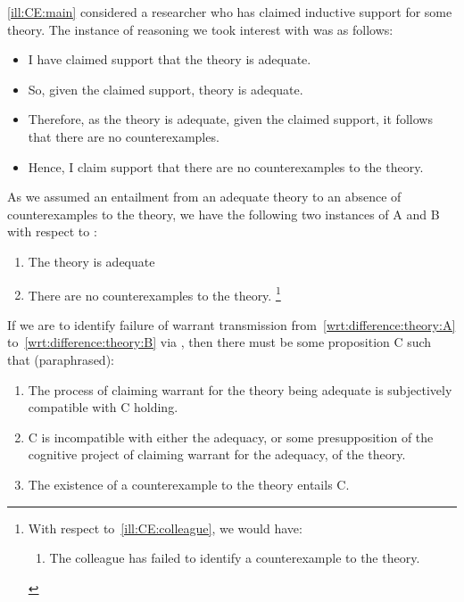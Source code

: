 \begin{note}
  \autoref{ill:CE:main} considered a researcher who has claimed inductive support for some theory.
  The instance of reasoning we took interest with was as follows:

  \begin{itemize}
  \item I have claimed support that the theory is adequate.
  \item So, given the claimed support, theory is adequate.
  \item Therefore, as the theory is adequate, given the claimed support, it follows that there are no counterexamples.
  \item Hence, I claim support that there are no counterexamples to the theory.
  \end{itemize}

  As we assumed an entailment from an adequate theory to an absence of counterexamples to the theory, we have the following two instances of A and B with respect to \wrt{}:

  \begin{enumerate}[label=\Alph*., ref=(\Alph*)]
  \item\label{wrt:difference:theory:A} The theory is adequate
  \item\label{wrt:difference:theory:B} There are no counterexamples to the theory.\nolinebreak
    \footnote{
      With respect to~\autoref{ill:CE:colleague}, we would have:
      \begin{enumerate}[label=\Alph*., ref=(\Alph*)]
      \item The colleague has failed to identify a counterexample to the theory.
      \end{enumerate}
    }
  \end{enumerate}

  If we are to identify failure of warrant transmission from~\ref{wrt:difference:theory:A} to~\ref{wrt:difference:theory:B} via \wrt{}, then there must be some proposition C such that (paraphrased):

  \begin{enumerate}[label=\roman*., ref=(\roman*)]
  \item\label{wrt:CE:maini} The process of claiming warrant for the theory being adequate is subjectively compatible with C holding.
  \item\label{wrt:CE:mainii} C is incompatible with either the adequacy, or some presupposition of the cognitive project of claiming warrant for the adequacy, of the theory.
  \item\label{wrt:CE:mainiii} The existence of a counterexample to the theory entails C.
  \end{enumerate}


\end{note}
